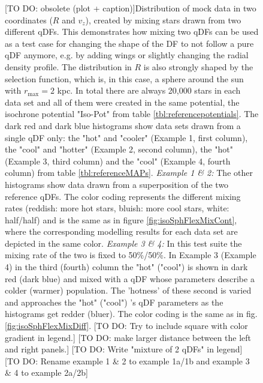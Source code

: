 

\begin{figure}
\caption{[TO DO: obsolete (plot + caption)]Distribution of mock data in two coordinates ($R$ and $v_z$), created by mixing stars drawn from two different qDFs. This demonstrates how mixing two qDFs can be used as a test case for changing the shape of the DF to not follow a pure qDF anymore, e.g. by adding wings or slightly changing the radial density profile. The distribution in $R$ is also strongly shaped by the selection function, which is, in this case, a sphere around the sun with $r_\text{max}=2$ kpc. In total there are always 20,000 stars in each data set and all of them were created in the same potential, the isochrone potential "Iso-Pot" from table \ref{tbl:referencepotentials}. The dark red and dark blue histograms show data sets drawn from a single qDF only: the "hot" and "cooler" \MAPs (Example 1, first column), the "cool" and "hotter" \MAPs (Example 2, second column), the "hot" (Example 3, third column) and the "cool" \MAPs (Example 4, fourth column) from table \ref{tbl:referenceMAPs}. \emph{Example 1 \& 2:} The other histograms show data drawn from a superposition of the two reference qDFs. The color coding represents the different mixing rates (reddish: more hot stars, bluish: more cool stars, white: half/half) and is the same as in figure \ref{fig:isoSphFlexMixCont}, where the corresponding modelling results for each data set are depicted in the same color. \emph{Example 3 \& 4:} In this test suite the mixing rate of the two \MAPs is fixed to 50\%/50\%. In Example 3 (Example 4) in the third (fourth) column the "hot" ("cool") \MAP is shown in dark red (dark blue) and mixed with a qDF whose parameters describe a colder (warmer) population. The 'hotness' of these second \MAP is varied and approaches the "hot" ("cool") \MAP's qDF parameters as the histograms get redder (bluer). The color coding is the same as in fig. \ref{fig:isoSphFlexMixDiff}. [TO DO: Try to include square with color gradient in legend.] [TO DO: make larger distance between the left and right panels.] [TO DO: Write "mixture of 2 qDFs" in legend] [TO DO: Rename example 1 \& 2 to example 1a/1b and example 3 \& 4 to example 2a/2b]}
\label{fig:isoSphFlexMix_mockdata}
\end{figure}

